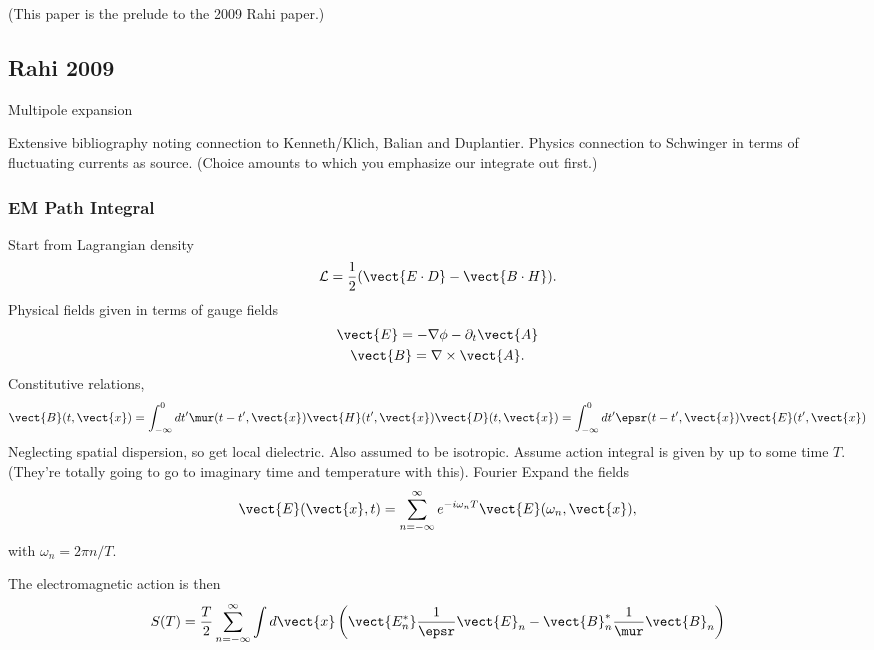 (This paper is the prelude to the 2009 Rahi paper.)

\subsection{Rahi 2009}

Multipole expansion
\cite{Buscher2004}
\cite{Rahi2009}

Extensive bibliography noting connection to Kenneth/Klich, Balian and Duplantier.
Physics connection to Schwinger in terms of fluctuating currents as source.
(Choice amounts to which you emphasize our integrate out first.)

\subsubsection{EM Path Integral}

Start from Lagrangian density
\begin{equation}
\mathcal{L} =\frac{1}{2}(\vect{E\cdot D}-\vect{B\cdot H}).
\end{equation}
Physical fields given in terms of gauge fields
\begin{gather}
\vect{E}=-\nabla\phi-\partial_t\vect{A}\\
\vect{B} = \nabla\times\vect{A}.
\end{gather}
Constitutive relations,
\begin{gather}
\vect{B}(t,\vect{x})=\int_{-\infty}^0 dt' \mur(t-t',\vect{x})\vect{H}(t',\vect{x})
\vect{D}(t,\vect{x})=\int_{-\infty}^0 dt' \epsr(t-t',\vect{x})\vect{E}(t',\vect{x})
\end{gather}
Neglecting spatial dispersion, so get local dielectric.  Also assumed to be 
isotropic.  
Assume action integral is given by up to some time $T$. (They're totally going
to go to imaginary time and temperature with this).
Fourier Expand the fields
\begin{equation}
  \vect{E}(\vect{x},t)=\sum_{n=-\infty}^{\infty} e^{-i\omega_nT}\vect{E}(\omega_n,\vect{x}),
\end{equation}
with $\omega_n=2\pi n/T$.

The electromagnetic action is then
\begin{equation}
S(T) = \frac{T}{2}\sum_{n=-\infty}^\infty \int d\vect{x}
\left(\vect{E_n^*}\frac{1}{\epsr}\vect{E}_n-\vect{B}_n^*\frac{1}{\mur}\vect{B}_n\right)
\end{equation}

